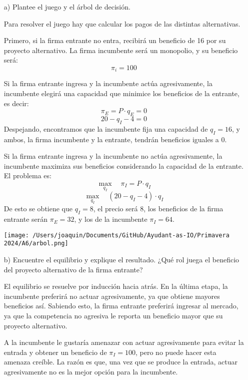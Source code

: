 \documentclass{exam}
\begin{document}
\begin{itemize}
\item[a)] Plantee el juego y el árbol de decisión.
    \begin{solution}
        Para resolver el juego hay que calcular los pagos de las distintas alternativas.

        Primero, si la firma entrante no entra, recibirá un beneficio de 16 por su proyecto alternativo. La firma incumbente será un monopolio, y su beneficio será:
        \[
        \pi_i = 100
        \]

        Si la firma entrante ingresa y la incumbente actúa agresivamente, la incumbente elegirá una capacidad que minimice los beneficios de la entrante, es decir:
        \[
        \pi_E = P \cdot q_E = 0
        \]
        \[
        20 - q_I - 4 = 0
        \]
        Despejando, encontramos que la incumbente fija una capacidad de \( q_I = 16 \), y ambos, la firma incumbente y la entrante, tendrán beneficios iguales a 0.

        Si la firma entrante ingresa y la incumbente no actúa agresivamente, la incumbente maximiza sus beneficios considerando la capacidad de la entrante. El problema es:
        \[
        \max_{q_I} \quad \pi_I = P \cdot q_I
        \]
        \[
        \max_{q_I} \quad (20 - q_I - 4) \cdot q_I
        \]
        De esto se obtiene que \( q_I = 8 \), el precio será 8, los beneficios de la firma entrante serán \( \pi_E = 32 \), y los de la incumbente \( \pi_I = 64 \).\newline
        \begin{center}
            \texttt{[image: /Users/joaquin/Documents/GitHub/Ayudant-as-IO/Primavera 2024/A6/arbol.png]}
        \end{center}
        
    \end{solution}

    \item[b)] Encuentre el equilibrio y explique el resultado. ¿Qué rol juega el beneficio del proyecto alternativo de la firma entrante?
    \begin{solution}
        El equilibrio se resuelve por inducción hacia atrás. En la última etapa, la incumbente preferirá no actuar agresivamente, ya que obtiene mayores beneficios así. Sabiendo esto, la firma entrante preferirá ingresar al mercado, ya que la competencia no agresiva le reporta un beneficio mayor que su proyecto alternativo.

        A la incumbente le gustaría amenazar con actuar agresivamente para evitar la entrada y obtener un beneficio de \( \pi_I = 100 \), pero no puede hacer esta amenaza creíble. La razón es que, una vez que se produce la entrada, actuar agresivamente no es la mejor opción para la incumbente.


\end{solution}
\end{itemize}
\end{document}
